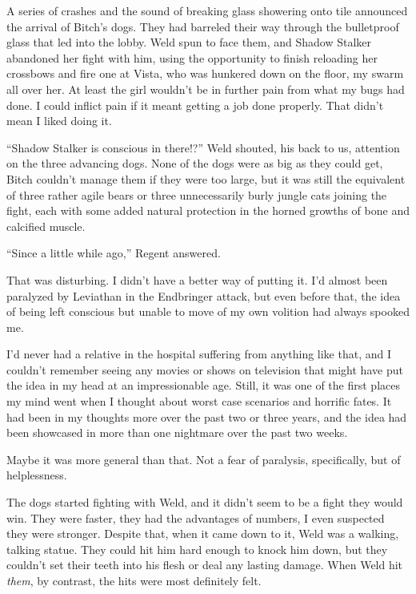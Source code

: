 A series of crashes and the sound of breaking glass showering onto tile announced the arrival of Bitch's dogs.  They had barreled their way through the bulletproof glass that led into the lobby.  Weld spun to face them, and Shadow Stalker abandoned her fight with him, using the opportunity to finish reloading her crossbows and fire one at Vista, who was hunkered down on the floor, my swarm all over her.  At least the girl wouldn't be in further pain from what my bugs had done.  I could inflict pain if it meant getting a job done properly.  That didn't mean I liked doing it.



``Shadow Stalker is conscious in there!?'' Weld shouted, his back to us, attention on the three advancing dogs.  None of the dogs were as big as they could get, Bitch couldn't manage them if they were too large, but it was still the equivalent of three rather agile bears or three unnecessarily burly jungle cats joining the fight, each with some added natural protection in the horned growths of bone and calcified muscle.



``Since a little while ago,'' Regent answered.



That was disturbing.  I didn't have a better way of putting it.  I'd almost been paralyzed by Leviathan in the Endbringer attack, but even before that, the idea of being left conscious but unable to move of my own volition had always spooked me.



I'd never had a relative in the hospital suffering from anything like that, and I couldn't remember seeing any movies or shows on television that might have put the idea in my head at an impressionable age.  Still, it was one of the first places my mind went when I thought about worst case scenarios and horrific fates.  It had been in my thoughts more over the past two or three years, and the idea had been showcased in more than one nightmare over the past two weeks.



Maybe it was more general than that.  Not a fear of paralysis, specifically, but of helplessness.



The dogs started fighting with Weld, and it didn't seem to be a fight they would win.  They were faster, they had the advantages of numbers, I even suspected they were stronger.  Despite that, when it came down to it, Weld was a walking, talking statue.  They could hit him hard enough to knock him down, but they couldn't set their teeth into his flesh or deal any lasting damage.  When Weld hit \emph{them}, by contrast, the hits were most definitely felt.



